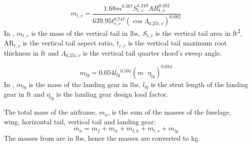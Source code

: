 \begin{equation}
    \label{eq:m_vertical_tail_classII}
    m_{t, v}  =\frac{1.68 m^{0.567} S_{t, v}^{1.249} A R_{t, v}^{0.482}}{639.95 t_{r, v}^{0.747}\left(\cos \Lambda_{0.25 t, v}\right)^{0.882}}
\end{equation}
In , $m_{t, v}$ is the mass of the vertical tail in \unit[]{lbs}, $S_{t, v}$ is the vertical tail area in \unit{ft^2}, $\mathrm{AR}_{t, v}$ is the vertical tail aspect ratio, $t_{r, v}$ is the vertical tail maximum root thickness in \unit{ft} and $\Lambda_{0.25 t, v}$ is the vertical tail quarter chord's sweep angle.

\begin{equation}
    \label{eq:m_landing_gear_classII}
    m_{l g}=0.054 l_{l g}{ }^{0.501}\left(m\cdot\eta_{l g}\right)^{0.684}
\end{equation}
In , $m_{l g}$ is the mass of the landing gear in \unit[]{lbs}, $l_{l g}$ is the strut length of the landing gear in \unit{ft} and $\eta_{l g}$ is the landing gear design load factor.

The total mass of the airframe, $m_a$, is the sum of the masses of the fuselage, wing, horizontal tail, vertical tail and landing gear:
\begin{equation}
    \label{eq:m_airframe_classII}
    m_a = m_f + m_w + m_{t, h} + m_{t, v} + m_{l g}
\end{equation}
The masses from  are in \unit{lbs}, hence the masses are converted to \unit{kg}.


